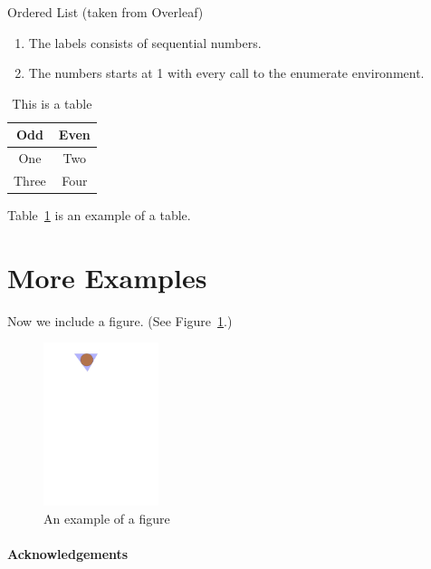 \documentclass[a4paper]{article}
\theoremstyle{plain}
\theoremstyle{definition}
\begin{document}
	Ordered List (taken from Overleaf)
	\begin{enumerate}
		\item The labels consists of sequential numbers.
		\item The numbers starts at 1 with every call to the enumerate environment.
	\end{enumerate}

	\begin{table}[ht]
		\centering
		\begin{tabular}{|c|c|}
			\hline
			\textbf{Odd} & \textbf{Even} \\
			\hline\hline
			One & Two \\
			\hline
			Three & Four \\
			\hline
		\end{tabular}
		\caption{This is a table}
		\label{tbl:1}
	\end{table}

	Table~\ref*{tbl:1} is an example of a table.
	
	\section{More Examples}
	\label{sec:examples}
	
	Now we include a figure.
	(See Figure~\ref{fig:example}.)
	\begin{figure}[ht]
		\centering
		\includegraphics[width=0.3\textwidth]{example}
		\caption{An example of a figure}
		\label{fig:example}
	\end{figure}
	
	\paragraph{Acknowledgements} \lipsum[6]
	
	
	\printbibliography
\end{document}
